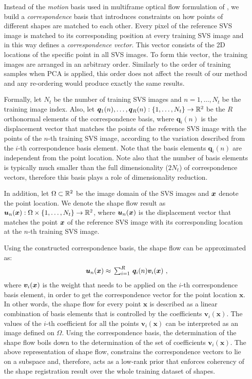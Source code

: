Instead of the \emph{motion} basis used in multiframe optical flow formulation of \cite{Garg:2013hu}, we build a \emph{correspondence} basis that introduces constraints on how points of different shapes are matched to each other. Every pixel of the reference SVS image is matched to its corresponding position at every training SVS image and in this way defines a \emph{correspondence vector}. This vector consists of the 2D locations of the specific point in all SVS images. To form this vector, the training images are arranged in an arbitrary order. Similarly to the order of training samples when PCA is applied, this order does not affect the result of our method and any re-ordering would produce exactly the same results.


Formally, let $N_t$ be the number of training SVS images and $n=1,\ldots,N_t$ be the training image index. Also, let $\boldsymbol{q}_1(n),\ldots,\boldsymbol{q}_R(n):
\{1,\ldots,N_t\} \rightarrow \mathbb{R}^2$ be the $R$ orthonormal elements of the correspondence basis, where $\boldsymbol{q}_i(n)$ is the displacement vector that matches the points of the reference SVS image with the points of the $n$-th training SVS image, according to the variation described from the $i$-th correspondence basis element. Note that the basis elements $\boldsymbol{q}_i(n)$ are independent from the point location. Note also that the number of basis elements is typically much smaller than the full dimensionality ($2 N_t$) of correspondence vectors, therefore this basis plays a role of dimensionality reduction.


In addition, let $\Omega \subset \mathbb{R}^2$ be the image domain of the SVS images and $\boldsymbol{x}$ denote the point location. We denote the shape flow result as $\bm{u}_n(\boldsymbol{x}):\Omega\times \{1,\ldots,N_t\}
\rightarrow \mathbb{R}^2$,  where $\bm{u}_n(\boldsymbol{x})$ is the displacement vector that matches the point $\boldsymbol{x}$ of the reference SVS image with its corresponding location at the $n$-th training SVS image.

Using the constructed correspondence basis, the shape flow can be approximated as:
\begin{equation}\label{eq:LinTrajModel}
    \bm{u}_n(\boldsymbol{x}) \approx
    \textstyle \, \sum_{i=1}^R \, \bm{q}_i(n)\bm{v}_i(\boldsymbol{x}) \,\, ,
\end{equation}
where $\bm{v}_i(\boldsymbol{x})$ is the weight that needs to be applied on the $i$-th correspondence basis element, in order to get the correspondence vector for the point location $\bm{x}$. In other words, the shape flow for every point $\bm{x}$ is described as a linear combination of basis elements that is controlled by the coefficients $\bm{v}_i(\bm{x})$.
The values of the $i$-th coefficient for all the points $\bm{v}_i(\bm{x})$ can be interpreted as an image defined on $\Omega$. Using the correspondence basis, the determination of the shape flow boils down to the determination of the set of coefficients $\bm{v}_i(\bm{x})$. The above representation of shape flow, constrains the correspondence vectors to lie on a subspace and, therefore, acts as a low-rank prior that enforces coherency of the shape registration result over the whole training dataset of shapes.


